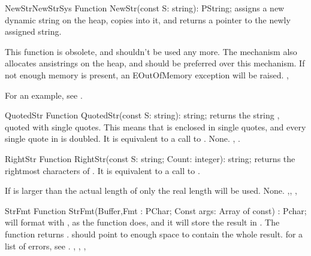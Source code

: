 

\begin{functionl}{NewStr}{NewStrSys}
\Declaration
Function NewStr(const S: string): PString;
\Description
{} assigns a new dynamic string on the heap, copies  into
it, and returns a pointer to the newly assigned string.

This function is obsolete, and shouldn't be used any more. The
 mechanism also allocates ansistrings on the heap, and
should be preferred over this mechanism.
\Errors
If not enough memory is present, an EOutOfMemory exception will be raised.
\SeeAlso
{}, 
\end{functionl}

For an example, see .

\begin{function}{QuotedStr}
\Declaration
Function QuotedStr(const S: string): string;
\Description
{} returns the string , quoted with single quotes. This means
that  is enclosed in single quotes, and every single quote in 
is doubled. It is equivalent to a call to .
\Errors
None.
\SeeAlso
{}, .
\end{function}




\begin{function}{RightStr}
\Declaration
Function RightStr(const S: string; Count: integer): string;
\Description
{} returns the  rightmost characters of .
It is equivalent to a call to .

If  is larger than the actual length of  only the real
length will be used.
\Errors
None.
\SeeAlso
{},, , 
\end{function}



\begin{function}{StrFmt}
\Declaration
Function StrFmt(Buffer,Fmt : PChar; Const args: Array of const) : Pchar;
\Description
{} will format  with , as the 
function does, and it will store the result in . The function
returns .  should point to enough space to contain
the whole result.
\Errors
for a list of errors, see .
\SeeAlso
{}, , , 
\end{function}

